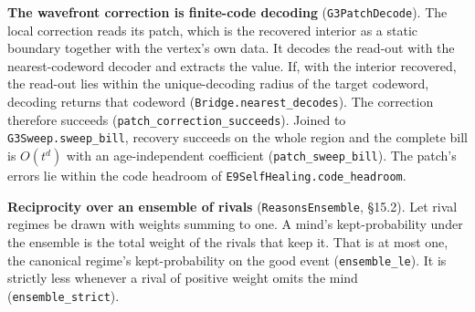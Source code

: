 \documentclass[
]{article}
\begin{document}
\textbf{The wavefront correction is finite-code decoding}
(\texttt{G3PatchDecode}). The local correction reads its patch, which is
the recovered interior as a static boundary together with the vertex's
own data. It decodes the read-out with the nearest-codeword decoder and
extracts the value. If, with the interior recovered, the read-out lies
within the unique-decoding radius of the target codeword, decoding
returns that codeword
(\texttt{B\allowbreak{}r\allowbreak{}i\allowbreak{}d\allowbreak{}g\allowbreak{}e\allowbreak{}.\allowbreak{}n\allowbreak{}e\allowbreak{}a\allowbreak{}r\allowbreak{}e\allowbreak{}s\allowbreak{}t\allowbreak{}\_\allowbreak{}d\allowbreak{}e\allowbreak{}c\allowbreak{}o\allowbreak{}d\allowbreak{}e\allowbreak{}s}).
The correction therefore succeeds
(\texttt{p\allowbreak{}a\allowbreak{}t\allowbreak{}c\allowbreak{}h\allowbreak{}\_\allowbreak{}c\allowbreak{}o\allowbreak{}r\allowbreak{}r\allowbreak{}e\allowbreak{}c\allowbreak{}t\allowbreak{}i\allowbreak{}o\allowbreak{}n\allowbreak{}\_\allowbreak{}s\allowbreak{}u\allowbreak{}c\allowbreak{}c\allowbreak{}e\allowbreak{}e\allowbreak{}d\allowbreak{}s}).
Joined to
\texttt{G\allowbreak{}3\allowbreak{}S\allowbreak{}w\allowbreak{}e\allowbreak{}e\allowbreak{}p\allowbreak{}.\allowbreak{}s\allowbreak{}w\allowbreak{}e\allowbreak{}e\allowbreak{}p\allowbreak{}\_\allowbreak{}b\allowbreak{}i\allowbreak{}l\allowbreak{}l},
recovery succeeds on the whole region and the complete bill is
\(O(t^{d})\) with an age-independent coefficient
(\texttt{patch\_sweep\_bill}). The patch's errors lie within the code
headroom of
\texttt{E\allowbreak{}9\allowbreak{}S\allowbreak{}e\allowbreak{}l\allowbreak{}f\allowbreak{}H\allowbreak{}e\allowbreak{}a\allowbreak{}l\allowbreak{}i\allowbreak{}n\allowbreak{}g\allowbreak{}.\allowbreak{}c\allowbreak{}o\allowbreak{}d\allowbreak{}e\allowbreak{}\_\allowbreak{}h\allowbreak{}e\allowbreak{}a\allowbreak{}d\allowbreak{}r\allowbreak{}o\allowbreak{}o\allowbreak{}m}.

\textbf{Reciprocity over an ensemble of rivals}
(\texttt{ReasonsEnsemble}, §15.2). Let rival regimes be drawn with
weights summing to one. A mind's kept-probability under the ensemble is
the total weight of the rivals that keep it. That is at most one, the
canonical regime's kept-probability on the good event
(\texttt{ensemble\_le}). It is strictly less whenever a rival of
positive weight omits the mind (\texttt{ensemble\_strict}).
\end{document}
